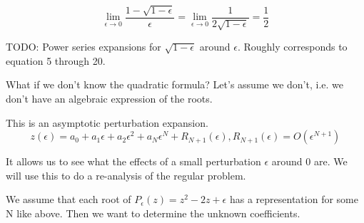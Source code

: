 \documentclass[12pt]{report}
\begin{document}
\begin{equation}
  \lim_{\epsilon \to 0} \frac{1 - \sqrt{1-\epsilon}}{\epsilon} =
  \lim_{\epsilon \to 0} \frac{1}{2\sqrt{1-\epsilon}} = \frac{1}{2}
\end{equation}

TODO: Power series expansions for $\sqrt{1-\epsilon}$ around
$\epsilon$. Roughly corresponds to equation 5 through 20.

What if we don't know the quadratic formula? Let's assume we don't,
i.e. we don't have an algebraic expression of the roots.

This is an asymptotic perturbation expansion.
\begin{equation}
  z(\epsilon) = a_0 + a_1\epsilon + a_2\epsilon^2 + a_N\epsilon^N +
  R_{N+1}(\epsilon), R_{N+1}(\epsilon) = O(\epsilon^{N+1})
\end{equation}

It allows us to see what the effects of a small perturbation
$\epsilon$ around 0 are. We will use this to do a re-analysis of the
regular problem.

We assume that each root of $P_\epsilon(z) = z^2 - 2z + \epsilon$ has
a representation for some N like above. Then we want to determine the
unknown coefficients.
\end{document}
